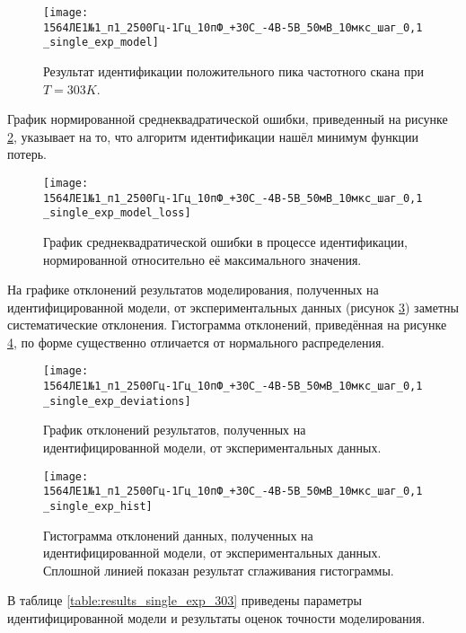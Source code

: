 	\begin{figure}[!htp]
		\centering
		\texttt{[image: 1564ЛЕ1№1\_п1\_2500Гц-1Гц\_10пФ\_+30С\_-4В-5В\_50мВ\_10мкс\_шаг\_0,1\_single\_exp\_model]}
		\caption{Результат идентификации положительного пика частотного скана
		         при $T=303K$.}
		\label{pic:model_single_exp_303}
	\end{figure}

	График нормированной среднеквадратической ошибки, приведенный на рисунке
	\ref{pic:loss_single_exp_303}, указывает на то, что алгоритм идентификации
	нашёл минимум функции потерь.

	\begin{figure}[!htp]
		\centering
		\texttt{[image: 1564ЛЕ1№1\_п1\_2500Гц-1Гц\_10пФ\_+30С\_-4В-5В\_50мВ\_10мкс\_шаг\_0,1\_single\_exp\_model\_loss]}
		\caption{График среднеквадратической ошибки в процессе идентификации,
		         нормированной относительно её максимального значения.}
		\label{pic:loss_single_exp_303}
	\end{figure}

	На графике отклонений результатов моделирования, полученных на идентифицированной
	модели, от экспериментальных данных (рисунок \ref{pic:deviations_single_exp_303})
	заметны систематические отклонения. Гистограмма отклонений, приведённая на 
	рисунке \ref{pic:hist_single_exp_303}, по форме существенно отличается от
	нормального распределения.

	\begin{figure}[!htp]
		\centering
		\texttt{[image: 1564ЛЕ1№1\_п1\_2500Гц-1Гц\_10пФ\_+30С\_-4В-5В\_50мВ\_10мкс\_шаг\_0,1\_single\_exp\_deviations]}
		\caption{График отклонений результатов, полученных на идентифицированной
		модели, от экспериментальных данных.}
		\label{pic:deviations_single_exp_303}
	\end{figure}

	\begin{figure}[!htp]
		\centering
		\texttt{[image: 1564ЛЕ1№1\_п1\_2500Гц-1Гц\_10пФ\_+30С\_-4В-5В\_50мВ\_10мкс\_шаг\_0,1\_single\_exp\_hist]}
		\caption{Гистограмма отклонений данных, полученных на идентифицированной 
		         модели, от экспериментальных данных. Сплошной линией показан
		         результат сглаживания гистограммы.}
		\label{pic:hist_single_exp_303}
	\end{figure}

	В таблице \ref{table:results_single_exp_303} приведены параметры 
	идентифицированной модели и результаты оценок точности моделирования.

